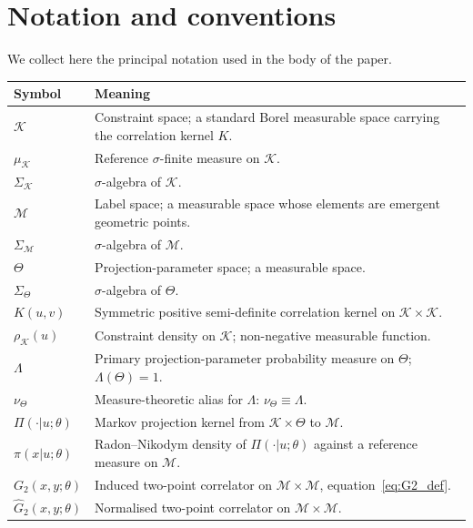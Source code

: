 ﻿\documentclass[12pt,a4paper]{article}
\theoremstyle{definition}
\begin{document}
\appendix

\clearpage
\section{Notation and conventions}
\label{app:notation}

We collect here the principal notation used in the body of the paper.

\begin{longtable}{@{}p{3.0cm} p{11.5cm}@{}}
\toprule
Symbol & Meaning \\
\midrule
$\mathcal{K}$ & Constraint space; a standard Borel measurable space carrying the correlation kernel $K$. \\
$\mu_{\mathcal{K}}$ & Reference $\sigma$-finite measure on $\mathcal{K}$. \\
$\Sigma_{\mathcal{K}}$ & $\sigma$-algebra of $\mathcal{K}$. \\
$\mathcal{M}$ & Label space; a measurable space whose elements are emergent geometric points. \\
$\Sigma_{\mathcal{M}}$ & $\sigma$-algebra of $\mathcal{M}$. \\
$\Theta$ & Projection-parameter space; a measurable space. \\
$\Sigma_\Theta$ & $\sigma$-algebra of $\Theta$. \\
$K(u,v)$ & Symmetric positive semi-definite correlation kernel on $\mathcal{K}\times\mathcal{K}$. \\
$\rho_{\mathcal{K}}(u)$ & Constraint density on $\mathcal{K}$; non-negative measurable function. \\
$\Lambda$ & Primary projection-parameter probability measure on $\Theta$; $\Lambda(\Theta)=1$. \\
$\nu_\Theta$ & Measure-theoretic alias for $\Lambda$: $\nu_\Theta \equiv \Lambda$. \\
$\Pi(\cdot|u;\theta)$ & Markov projection kernel from $\mathcal{K}\times\Theta$ to $\mathcal{M}$. \\
$\pi(x|u;\theta)$ & Radon--Nikodym density of $\Pi(\cdot|u;\theta)$ against a reference measure on $\mathcal{M}$. \\
$G_2(x,y;\theta)$ & Induced two-point correlator on $\mathcal{M}\times\mathcal{M}$, equation~\eqref{eq:G2_def}. \\
$\widehat{G}_2(x,y;\theta)$ & Normalised two-point correlator on $\mathcal{M}\times\mathcal{M}$. \\

\end{longtable}
\end{document}
